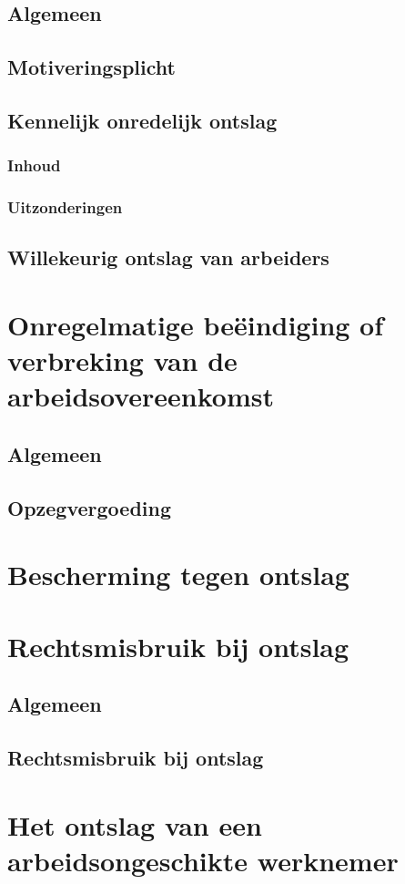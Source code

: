 \subsection{Algemeen}

\subsection{Motiveringsplicht}

\subsection{Kennelijk onredelijk ontslag}

\subsubsection{Inhoud}

\subsubsection{Uitzonderingen}

\subsection{Willekeurig ontslag van arbeiders}

\section{Onregelmatige beëindiging of verbreking van de arbeidsovereenkomst}

\subsection{Algemeen}

\subsection{Opzegvergoeding}

\section{Bescherming tegen ontslag}

\section{Rechtsmisbruik bij ontslag}

\subsection{Algemeen}

\subsection{Rechtsmisbruik bij ontslag}

\section{Het ontslag van een arbeidsongeschikte werknemer}




